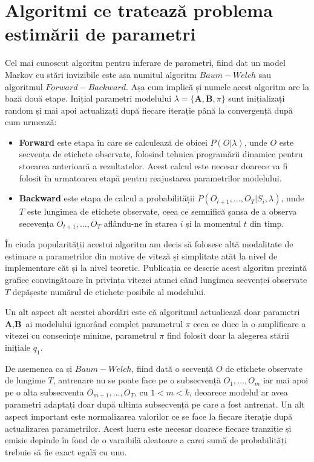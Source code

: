 \section{Algoritmi ce tratează problema estimării de parametri}
Cel mai cunoscut algoritm pentru inferare de parametri, fiind dat un model Markov cu stări invizibile este așa numitul algoritm $Baum-Welch$ sau algoritmul $Forward-Backward$. Așa cum implică și numele acest algoritm are la bază două etape. Inițial parametri modelului $\lambda = \{\textbf{A},\textbf{B},\pi\}$ sunt inițializați random și mai apoi actualizați după fiecare iterație până la convergență după cum urmează:
\begin{itemize}
\item{\textbf{Forward} este etapa în care se calculează de obicei $P(O|\lambda)$, unde $O$ este secvența de etichete observate, folosind tehnica programării dinamice pentru stocarea anterioară a rezultatelor. Acest calcul este necesar doarece va fi folosit în urmatoarea etapă pentru reajustarea parametrilor modelului.}
\item{\textbf{Backward} este etapa de calcul a probabilității $P(O_{t+1},\dots,O_{T}| S_{i},\lambda)$, unde $T$ este lungimea de etichete observate, ceea ce semnifică șansa de a observa secevența $O_{t+1},\dots,O_{T}$ aflându-ne în starea $i$ și la momentul $t$ din timp}.
\end{itemize}
\par

În ciuda popularității acestui algoritm am decis să folosesc altă modalitate de estimare a parametrilor din motive de viteză și simplitate atăt la nivel de implementare căt și la nivel teoretic. Publicația ce descrie acest algoritm prezintă grafice convingătoare în privința vitezei atunci cănd lungimea secvenței observate $T$ depășeste numărul de etichete posibile al modelului.\par

Un alt aspect alt acestei abordări este că algoritmul actualiează doar parametri $\textbf{A},\textbf{B}$ ai modelului ignorând complet parametrul $\pi$ ceea ce duce la o amplificare a vitezei cu consecințe minime, parametrul $\pi$  find folosit doar la alegerea stării inițiale $q_{1}$.\par

De asemenea ca și $Baum-Welch$, fiind dată o secvență $O$ de etichete observate de lungime $T$, antrenare nu se poate face pe o subsecvență $O_{1},\dots,O_{m}$ iar mai apoi pe o alta subsecventa $O_{m+1},\dots,O_{T}$, cu $1 < m < k$, deoarece modelul ar avea parametri adaptați doar după ultima subsecvență pe care a fost antrenat. Un alt aspect important este normalizarea valorilor ce se face la fiecare iterație după actualizarea parametrilor. Acest lucru este necesar doarece fiecare tranziție și emisie depinde în fond de o varaibilă aleatoare a carei sumă de probabilități trebuie să fie exact egală cu unu.\par

